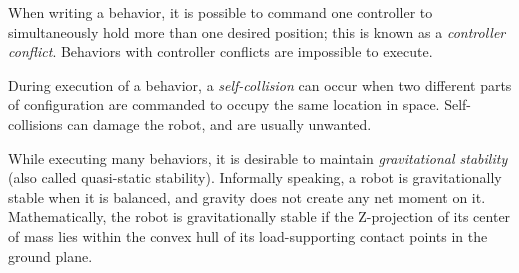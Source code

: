 \documentclass[conference]{IEEEtran}
\theoremstyle{definition}
\begin{document}
When writing a behavior, it is possible to command one controller to
simultaneously hold more than one desired position; this is known as a
\textit{controller conflict}.  Behaviors with controller conflicts are
impossible to execute.

During execution of a behavior, a \textit{self-collision} can occur when two
different parts of configuration are commanded to occupy the same location in
space.  Self-collisions can damage the robot, and are usually unwanted.

While executing many behaviors, it is desirable to maintain \textit{gravitational
stability} (also called quasi-static stability).  Informally speaking, a
robot is gravitationally stable when it is balanced, and gravity does not
create any net moment on it.  Mathematically, the robot is gravitationally stable
if the Z-projection of its center of
mass lies within the convex hull of its load-supporting contact points in the
ground plane.  
\end{document}
